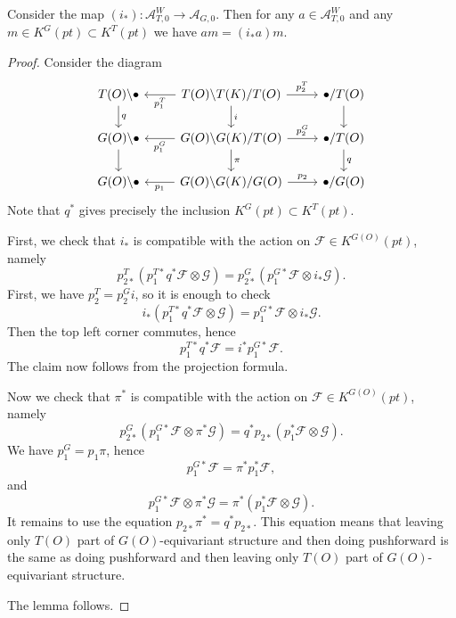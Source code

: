 \documentclass{article}
\newcommand{\mc}[1]{\mathcal{#1}}
\begin{document}
\begin{lem}
\label{LemLocalizationIsCompatibleWithAction}
Consider the map $(i_*)\colon \mc{A}_{T,0}^W\to \mc{A}_{G,0}$. Then for any $a\in \mc{A}_{T,0}^W$ and any $m\in K^G(pt)\subset K^T(pt)$ we have $am=(i_*a)m$.
\end{lem}
\begin{proof}
Consider the diagram
\[
\begin{tikzcd}
T(O)\backslash\bullet\ar[d,"q"] & \ar[l,"p_1^T"] T(O)\backslash T(K)/T(O)\ar[r,"p_2^T"]\ar[d,"i"] & \bullet/T(O)\ar[d]\\
G(O)\backslash\bullet\ar[d] & \ar[l,"p_1^G"] G(O)\backslash G(K)/T(O)  \ar[r,"p_2^G"]\ar[d,"\pi"] &\bullet/T(O)\ar[d,"q"]\\
G(O)\backslash\bullet & \ar[l,"p_1"] G(O)\backslash G(K)/G(O) \ar[r,"p_2"] & \bullet/G(O)
\end{tikzcd}
\]
Note that $q^*$ gives precisely the inclusion $K^G(pt)\subset K^T(pt)$.

First, we check that $i_*$ is compatible with the action on $\mc{F}\in K^{G(O)}(pt)$, namely
\[p_{2*}^T(p_1^{T*}q^*\mc{F}\otimes \mc{G})=p_{2*}^G(p_1^{G*}\mc{F}\otimes i_*\mc{G}).\] First, we have $p_2^T=p_2^Gi$, so it is enough to check
\[i_*(p_1^{T*}q^*\mc{F}\otimes \mc{G})=p_1^{G*}\mc{F}\otimes i_*\mc{G}.\] Then the top left corner commutes, hence 
\[p_1^{T*}q^*\mc{F}=i^*p_1^{G*}\mc{F}.\] The claim now follows from the projection formula.

Now we check that $\pi^*$ is compatible with the action on $\mc{F}\in K^{G(O)}(pt)$, namely
\[p_{2*}^G(p_1^{G*}\mc{F}\otimes\pi^*\mc{G})=q^*p_{2*}(p_1^*\mc{F}\otimes\mc{G}).\] We have $p_1^G=p_1\pi$, hence 
\[p_1^{G*}\mc{F}=\pi^*p_1^*\mc{F},\] and 
\[p_1^{G*}\mc{F}\otimes\pi^*\mc{G}=\pi^*(p_1^*\mc{F}\otimes \mc{G}).\] It remains to use the equation $p_{2*}\pi^*=q^*p_{2*}$. This equation means that leaving only $T(O)$ part of $G(O)$-equivariant structure and then doing pushforward is the same as doing pushforward and then leaving only $T(O)$ part of $G(O)$-equivariant structure.

The lemma follows.

\end{proof}
\end{document}
